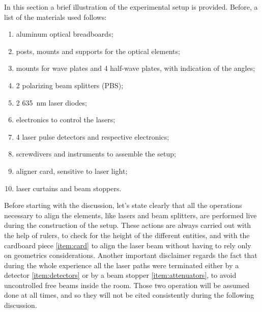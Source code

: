 In this section a brief illustration of the experimental setup is provided.
Before, a list of the materials used follows:
\begin{enumerate}[label=\alph*)]
\item \label{item:breadboard} aluminum optical breadboards;
\item posts, mounts and supports for the optical elements;
\item \label{item:half_wave} mounts for wave plates and 4 half-wave plates, with
  indication of the angles;
\item \label{item:pbs} 2 polarizing beam splitters (PBS);
\item \label{item:laser} 2 \SI{635}{\nano \meter} laser diodes;
\item electronics to control the lasers;
\item \label{item:detectors} 4 laser pulse detectors and respective electronics;
\item screwdivers and instruments to assemble the setup;
\item \label{item:card} aligner card, sensitive to laser light;
\item \label{item:attenuators} laser curtains and beam stoppers.
\end{enumerate}

Before starting with the discussion, let's state clearly that all the
operations necessary
to align the elements, like
lasers and beam splitters, are performed live during the construction
of the setup. These actions are
always carried out with the help of rulers, to check for the height of the
different entities, and with the cardboard piece
\cref{item:card} to align the
laser beam without having to
rely only on geometrics considerations.
Another important disclaimer regards the fact that during the whole
experience all the laser paths were terminated either by a detector
\cref{item:detectors}
or by a beam stopper \cref{item:attenuators}, to avoid uncontrolled
free beams inside the room.
Those two operation will be assumed done at all times, and so they
will not be cited consistently during the following discussion.


